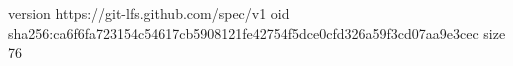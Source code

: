 version https://git-lfs.github.com/spec/v1
oid sha256:ca6f6fa723154c54617cb5908121fe42754f5dce0cfd326a59f3cd07aa9e3cec
size 76
